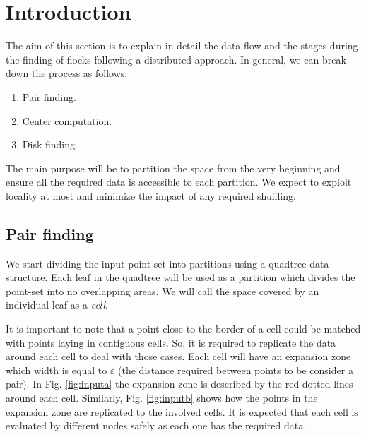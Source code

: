 \documentclass[twocolumn]{IEEEtran}
\begin{document}
\section*{Introduction}
The aim of this section is to explain in detail the data flow and the stages during the finding of flocks following a distributed approach.  In general, we can break down the process as follows:
\begin{enumerate}
\item Pair finding.
\item Center computation.
\item Disk finding.
\end{enumerate}

The main purpose will be to partition the space from the very beginning and ensure all the required data is accessible to each partition.  We expect to exploit locality at most and minimize the impact of any required shuffling.   


\subsection*{Pair finding}
We start dividing the input point-set into partitions using a quadtree data structure.  Each leaf in the quadtree will be used as a partition which divides the point-set into no overlapping areas.  We will call the space covered by an individual leaf as a \textit{cell}.

It is important to note that a point close to the border of a cell could be matched with points laying in contiguous cells.  So, it is required to replicate the data around each cell to deal with those cases.  Each cell will have an expansion zone which width is equal to $\varepsilon$ (the distance required between points to be consider a pair). In Fig. \ref{fig:inputa} the expansion zone is described by the red dotted lines around each cell.  Similarly, Fig. \ref{fig:inputb} shows how the points in the expansion zone are replicated to the involved cells.  It is expected that each cell is evaluated by different nodes safely as each one has the required data.
\end{document}
